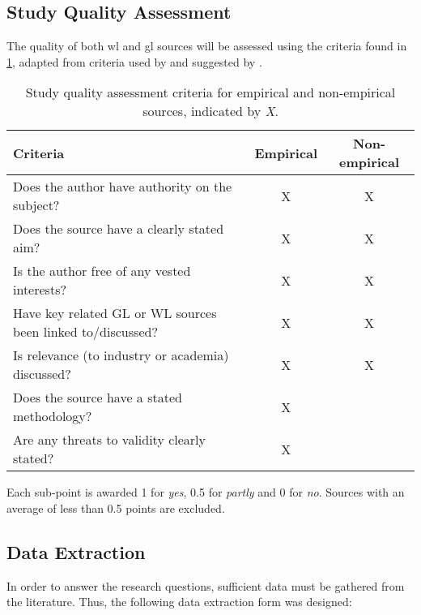 \subsection{Study Quality Assessment}
The quality of both \acrshort{wl} and \acrshort{gl} sources will be assessed using the criteria found in \cref{tab:study_quality_criteria}, adapted from criteria used by \cite{Giray2021} and suggested by \cite{Garousi2016}.
\begin{table}[h]
    \centering
    \begin{tabular}{l c c}
        Criteria & Empirical & Non-empirical \\
        \hline
        Does the author have authority on the subject? & X & X \\
        Does the source have a clearly stated aim? & X & X \\
        Is the author free of any vested interests? & X & X \\
        Have key related GL or WL sources been linked to/discussed? & X & X \\
        Is relevance (to industry or academia) discussed? & X & X \\
        Does the source have a stated methodology? & X &  \\
        Are any threats to validity clearly stated? & X & \\
    \end{tabular}
    \caption{Study quality assessment criteria for empirical and non-empirical sources, indicated by \emph{X}.}
    \label{tab:study_quality_criteria}
\end{table}
Each sub-point is awarded 1 for \emph{yes}, 0.5 for \emph{partly} and 0 for \emph{no}.
Sources with an average of less than 0.5 points are excluded.

\subsection{Data Extraction}
In order to answer the research questions, sufficient data must be gathered from the literature.
Thus, the following data extraction form was designed:


